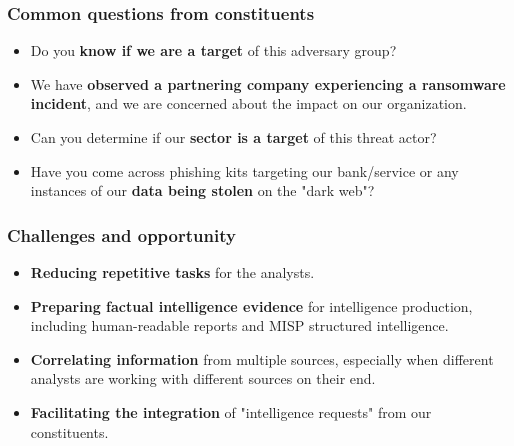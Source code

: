 \documentclass{beamer}
\begin{document}
\begin{frame}
  \frametitle{Common questions from constituents}
  \begin{itemize}
      \item Do you {\bf know if we are a target} of this adversary group?
      \item We have {\bf observed a partnering company experiencing a ransomware incident}, and we are concerned about the impact on our organization.
      \item Can you determine if our {\bf sector is a target} of this threat actor?
      \item Have you come across phishing kits targeting our bank/service or any instances of our {\bf data being stolen} on the "dark web"?
  \end{itemize}
\end{frame}

\begin{frame}
  \frametitle{Challenges and opportunity}
  \begin{itemize}
   \item {\bf Reducing repetitive tasks} for the analysts.
   \item {\bf Preparing factual intelligence evidence} for intelligence production, including human-readable reports and MISP structured intelligence.
   \item {\bf Correlating information} from multiple sources, especially when different analysts are working with different sources on their end.
   \item {\bf Facilitating the integration} of "intelligence requests" from our constituents.
\end{itemize}

\end{frame}
\end{document}

